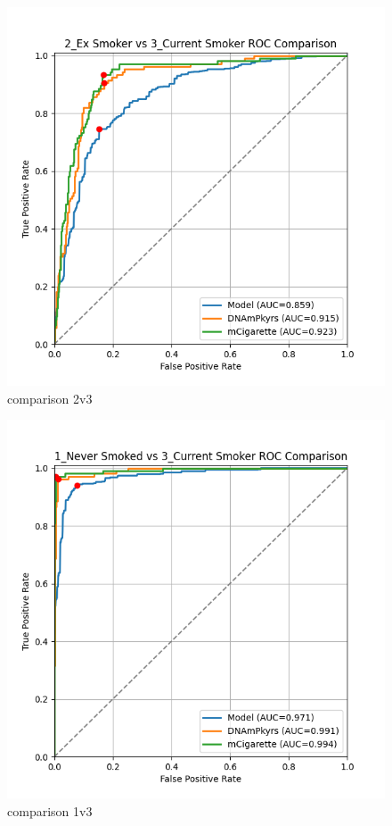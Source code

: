 \documentclass{article}
\begin{document}
\begin{figure}
    \centering
    \includegraphics[width=\linewidth]{comparison_2v3_roc.png}
    \caption{comparison 2v3}
\end{figure}

\begin{figure}
    \centering
    \includegraphics[width=\linewidth]{comparison_1v3_roc.png}
    \caption{comparison 1v3}
\end{figure}
\end{document}
